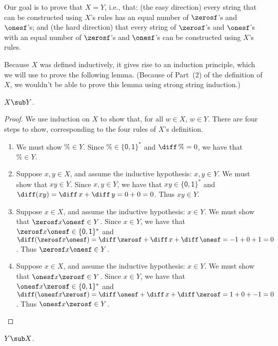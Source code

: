 Our goal is to prove that $X=Y$, i.e., that: (the easy direction)
every string that can be constructed using $X$'s rules has an equal
number of $\zerosf$'s and $\onesf$'s; and (the hard direction)
that every string of $\zerosf$'s and $\onesf$'s with an equal number
of $\zerosf$'s and $\onesf$'s can be constructed using $X$'s
rules.

Because $X$ was defined inductively, it gives rise to an
induction principle, which we will use to prove the following lemma.
%
(Because of Part~(2) of the definition of $X$, we wouldn't be
able to prove this lemma using strong string induction.)

\begin{lemma}
\label{SSIProp2Lem1}
$X\sub Y$.
\end{lemma}

\begin{proof}
We use induction on $X$ to show that, for all $w\in X$, $w\in Y$.
There are four steps to show, corresponding to the four rules
of $X$'s definition.
\begin{enumerate}[\quad(1)]
\item We must show $\%\in Y$.  Since $\%\in\{\mathsf{0,1}\}^*$ and
  $\diff\,\%=0$, we have that $\%\in Y$.

\item Suppose $x,y\in X$, and assume the inductive hypothesis: $x,y\in
  Y$.  We must show that $xy\in Y$.  Since $x,y\in Y$, we have that
  $xy\in\{\mathsf{0,1}\}^*$ and $\diff(xy)=\diff\,x+\diff\,y=0+0=0$.
  Thus $xy\in Y$.

\item Suppose $x\in X$, and assume the inductive hypothesis: $x\in Y$.
  We must show that $\zerosf x\onesf\in Y$.  Since $x\in Y$, we have
  that $\zerosf x\onesf\in \{\mathsf{0,1}\}^*$ and $\diff(\zerosf
  x\onesf)= \diff\,\zerosf+\diff\,x+\diff\,\onesf=-1+0+1=0$.  Thus
  $\zerosf x\onesf\in Y$.

\item Suppose $x\in X$, and assume the inductive hypothesis: $x\in Y$.
  We must show that $\onesf x\zerosf\in Y$.  Since $x\in Y$, we have
  that $\onesf x\zerosf\in\{\mathsf{0,1}\}^*$ and $\diff(\onesf
  x\zerosf)= \diff\,\onesf+\diff\,x+\diff\,\zerosf=1+0+-1=0$.  Thus
  $\onesf x\zerosf\in Y$.
\end{enumerate}
\end{proof}

\begin{lemma}
\label{SSIProp2Lem2}
$Y\sub X$.
\end{lemma}

